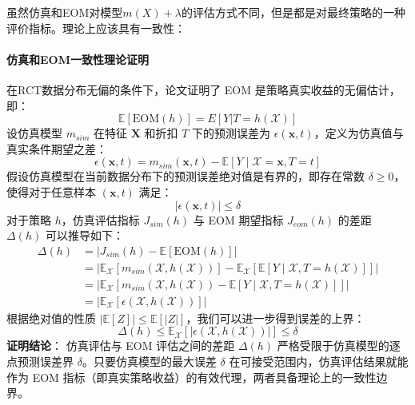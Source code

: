 \documentclass[12pt, a4paper]{article}
\begin{document}
虽然仿真和EOM对模型$m(X)+\lambda$的评估方式不同，但是都是对最终策略的一种评价指标。理论上应该具有一致性：
\paragraph{仿真和EOM一致性理论证明}
在RCT数据分布无偏的条件下，论文\cite{zhao2017uplift}证明了 EOM 是策略真实收益的无偏估计，即：
\begin{equation}
    \mathbb{E}[\text{EOM}(h)] = E[Y|T=h(\mathcal{X})]
\end{equation}
设仿真模型 $m_{sim}$ 在特征 $\bm{X}$ 和折扣 $T$ 下的预测误差为 $\epsilon(\bm{x}, t)$，定义为仿真值与真实条件期望之差：
\begin{equation}
    \epsilon(\bm{x}, t) = m_{sim}(\bm{x}, t) - \mathbb{E}[Y \mid \mathcal{X}=\bm{x}, T=t]
\end{equation}
假设仿真模型在当前数据分布下的预测误差绝对值是有界的，即存在常数 $\delta \geq 0$，使得对于任意样本 $(\bm{x}, t)$ 满足：
\begin{equation}
    |\epsilon(\bm{x}, t)| \leq \delta
\end{equation}
对于策略 $h$，仿真评估指标 $J_{sim}(h)$ 与 EOM 期望指标 $J_{eom}(h)$ 的差距 $\Delta(h)$ 可以推导如下：
\begin{equation}
\begin{aligned}
    \Delta(h) &= \left| J_{sim}(h) - \mathbb{E}[\text{EOM}(h)] \right| \\
    &= \left| \mathbb{E}_{\mathcal{X}}[m_{sim}(\mathcal{X}, h(\mathcal{X}))] - \mathbb{E}_{\mathcal{X}}[\mathbb{E}[Y \mid \mathcal{X}, T=h(\mathcal{X})]] \right| \\
    &= \left| \mathbb{E}_{\mathcal{X}} \left[ m_{sim}(\mathcal{X}, h(\mathcal{X})) - \mathbb{E}[Y \mid \mathcal{X}, T=h(\mathcal{X})] \right] \right| \\
    &= \left| \mathbb{E}_{\mathcal{X}} [\epsilon(\mathcal{X}, h(\mathcal{X}))] \right|
\end{aligned}
\end{equation}
根据绝对值的性质 $|\mathbb{E}[Z]| \leq \mathbb{E}[|Z|]$，我们可以进一步得到误差的上界：
\begin{equation}
    \Delta(h) \leq \mathbb{E}_{\mathcal{X}} [ |\epsilon(\mathcal{X}, h(\mathcal{X}))| ] \leq \delta
\end{equation}
\textbf{证明结论}：
仿真评估与 EOM 评估之间的差距 $\Delta(h)$ 严格受限于仿真模型的逐点预测误差界 $\delta$。只要仿真模型的最大误差 $\delta$ 在可接受范围内，仿真评估结果就能作为 EOM 指标（即真实策略收益）的有效代理，两者具备理论上的一致性边界。
\end{document}
